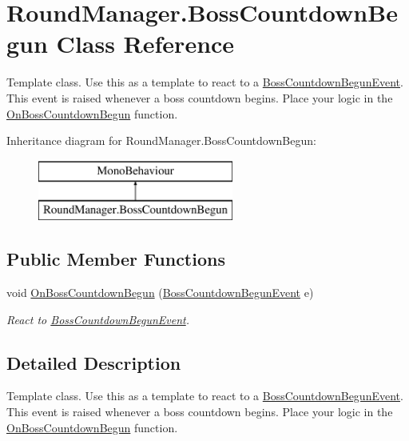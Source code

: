 \hypertarget{class_round_manager_1_1_boss_countdown_begun}{}\section{Round\+Manager.\+Boss\+Countdown\+Begun Class Reference}
\label{class_round_manager_1_1_boss_countdown_begun}


Template class. Use this as a template to react to a \hyperlink{class_round_manager_1_1_events_1_1_boss_countdown_begun_event}{Boss\+Countdown\+Begun\+Event}. This event is raised whenever a boss countdown begins. Place your logic in the \hyperlink{class_round_manager_1_1_boss_countdown_begun_a2078435316b5acaaaf56e1be92666626}{On\+Boss\+Countdown\+Begun} function.  


Inheritance diagram for Round\+Manager.\+Boss\+Countdown\+Begun\+:\begin{figure}[H]
\begin{center}
\leavevmode
\includegraphics[height=2.000000cm]{class_round_manager_1_1_boss_countdown_begun}
\end{center}
\end{figure}
\subsection*{Public Member Functions}
\begin{DoxyCompactItemize}
\item 
void \hyperlink{class_round_manager_1_1_boss_countdown_begun_a2078435316b5acaaaf56e1be92666626}{On\+Boss\+Countdown\+Begun} (\hyperlink{class_round_manager_1_1_events_1_1_boss_countdown_begun_event}{Boss\+Countdown\+Begun\+Event} e)
\begin{DoxyCompactList}\small\item\em React to \hyperlink{class_round_manager_1_1_events_1_1_boss_countdown_begun_event}{Boss\+Countdown\+Begun\+Event}. \end{DoxyCompactList}\end{DoxyCompactItemize}


\subsection{Detailed Description}
Template class. Use this as a template to react to a \hyperlink{class_round_manager_1_1_events_1_1_boss_countdown_begun_event}{Boss\+Countdown\+Begun\+Event}. This event is raised whenever a boss countdown begins. Place your logic in the \hyperlink{class_round_manager_1_1_boss_countdown_begun_a2078435316b5acaaaf56e1be92666626}{On\+Boss\+Countdown\+Begun} function. 



